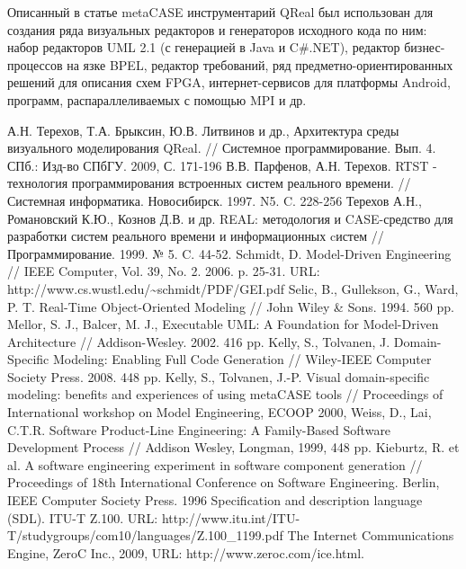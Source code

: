 \documentclass[a4paper]{article}
\begin{document}
Описанный в статье metaCASE инструментарий QReal был использован для создания ряда визуальных редакторов и генераторов исходного кода по ним: набор редакторов UML 2.1 (с генерацией в Java и C\#.NET), редактор бизнес-процессов на язке BPEL, редактор требований, ряд предметно-ориентированных решений для описания схем FPGA, интернет-сервисов для платформы Android, программ, распараллеливаемых с помощью MPI и др.

\begin{thebibliography}{9001}
   А.Н. Терехов, Т.А. Брыксин, Ю.В. Литвинов и др., Архитектура среды визуального моделирования QReal. // Системное программирование. Вып. 4. СПб.: Изд-во СПбГУ. 2009, С. 171-196
   В.В. Парфенов, А.Н. Терехов. RTST - технология программирования встроенных систем реального времени. // Системная информатика. Новосибирск. 1997. N5. C. 228-256
   Терехов А.Н., Романовский К.Ю., Кознов Д.В. и др. REAL: методология и CASE-средство для разработки систем реального времени и информационных cистем // Программирование. 1999. № 5. C. 44-52.
   Schmidt, D. Model-Driven Engineering // IEEE Computer, Vol. 39, No. 2. 2006. p. 25-31. URL: http://www.cs.wustl.edu/\textasciitilde schmidt/PDF/GEI.pdf
   Selic, B., Gullekson, G., Ward, P. T. Real-Time Object-Oriented Modeling // John Wiley \& Sons. 1994. 560 pp.
   Mellor, S. J., Balcer, M. J., Executable UML: A Foundation for Model-Driven Architecture // Addison-Wesley. 2002. 416 pp.
   Kelly, S., Tolvanen, J. Domain-Specific Modeling: Enabling Full Code Generation // Wiley-IEEE Computer Society Press. 2008. 448 pp.
   Kelly, S., Tolvanen, J.-P. Visual domain-specific modeling: benefits and experiences of using metaCASE tools // Proceedings of International workshop on Model Engineering, ECOOP 2000, 
   Weiss, D., Lai, C.T.R. Software Product-Line Engineering: A Family-Based Software Development Process // Addison Wesley, Longman, 1999, 448 pp.	
   Kieburtz, R. et al. A software engineering experiment in software component generation // Proceedings of 18th International Conference on Software Engineering. Berlin, IEEE Computer Society Press. 1996
   Specification and description language (SDL). ITU-T Z.100. URL: http://www.itu.int/ITU-T/studygroups/com10/languages/Z.100\_1199.pdf
   The Internet Communications Engine, ZeroC Inc., 2009, URL: http://www.zeroc.com/ice.html.

\end{thebibliography}
\end{document}
